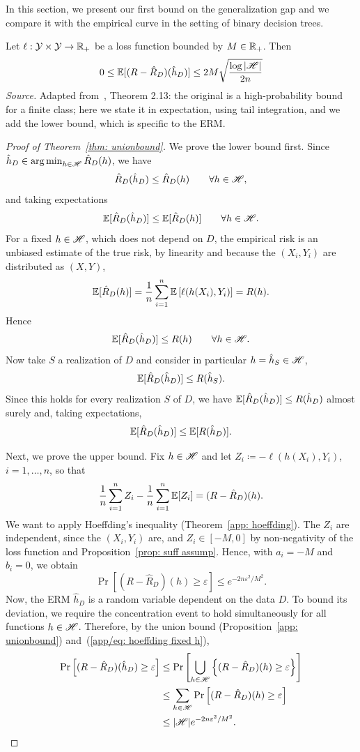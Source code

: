 \documentclass[reqno]{amsart}
\begin{document}
In this section, we present our first bound on the generalization gap and we compare it with the empirical curve in the setting of binary decision trees.

\begin{theorem}\label{thm: unionbound} Let $\ell:\mathcal{Y}\times\mathcal{Y}\to\mathbb{R}_+$ be a loss function bounded by $M\in\mathbb{R}_+$. Then
\[                
  0 \le \mathbb{E}[(R - \hat R_D)(\hat h_D)] \le 2M\sqrt{\frac{\log \vert \mathscr{H} \vert}{2n}}
\]
\textnormal{\emph{Source.} Adapted from~\cite{mohri2018foundations}, Theorem 2.13: the original is a high-probability bound for a finite class; here we state it in expectation, using tail integration, and we add the lower bound, which is specific to the ERM.}

\begin{proof}[Proof of Theorem~\ref{thm: unionbound}]
We prove the lower bound first. Since $\hat h_D \in \operatorname*{arg\,min}_{h\in\mathscr{H}} \hat R_D(h)$, we have
\[
\hat R_D(\hat h_D) \le \hat R_D(h) \qquad \forall h\in\mathscr{H},
\]
and taking expectations
\[
\mathbb{E}[\hat R_D(\hat h_D)] \le \mathbb{E}[\hat R_D(h)] \qquad \forall h\in\mathscr{H}.
\]
For a fixed $h\in\mathscr{H}$, which does not depend on $D$, the empirical risk is an unbiased estimate of the true risk, by linearity and because the $(X_i,Y_i)$ are distributed as $(X,Y)$,
\[
\mathbb{E}[\hat R_D(h)] = \frac1n\sum_{i=1}^n \mathbb{E}\left[\ell(h(X_i),Y_i)\right] = R(h).
\]
Hence
\[
\mathbb{E}[\hat R_D(\hat h_D)] \le R(h) \qquad \forall h\in\mathscr{H}.
\]
Now take $S$ a realization of $D$ and consider in particular $h=\hat h_{S}\in\mathscr{H}$,
\[
\mathbb{E}[\hat R_D(\hat h_D)] \le R(\hat h_{S}).
\]
Since this holds for every realization $S$ of $D$, we have $\mathbb{E}[\hat R_D(\hat h_D)] \le R(\hat h_D)$ almost surely and, taking expectations,
\[
\mathbb{E}[\hat R_D(\hat h_D)] \le \mathbb{E}[R(\hat h_D)].
\]

Next, we prove the upper bound. Fix $h\in\mathscr{H}$ and let $Z_i \coloneq -\ell(h(X_i),Y_i)$, $i=1,\ldots,n$, so that
\[
\frac1n\sum_{i=1}^n Z_i - \frac1n\sum_{i=1}^n \mathbb{E}[Z_i] = (R - \hat R_D)(h).
\]
We want to apply Hoeffding's inequality (Theorem~\ref{app: hoeffding}). The $Z_i$ are independent, since the $(X_i,Y_i)$ are, and $Z_i\in[-M,0]$ by non-negativity of the loss function and Proposition~\ref{prop: suff assump}. Hence, with $a_i = -M$ and $b_i = 0$, we obtain
\begin{equation}\label{app/eq: hoeffding fixed h}
\Pr\left[(R - \hat R_D)(h) \ge \varepsilon\right] \le e^{-2n\varepsilon^2/M^2}.
\end{equation}
Now, the ERM $\hat{h}_D$ is a random variable dependent on the data $D$. To bound its deviation, we require the concentration event to hold simultaneously for all functions $h \in \mathscr{H}$. Therefore, by the union bound (Proposition~\ref{app: unionbound}) and~(\ref{app/eq: hoeffding fixed h}),
\begin{align}\label{app/eq: unionbound prob}
\Pr\left[(R-\hat R_D)(\hat h_D) \ge \varepsilon\right] &\le \Pr\left[\bigcup_{h\in\mathscr{H}}\left\{(R - \hat R_D)(h)\ge\varepsilon\right\}\right] \notag \\
&\le \sum_{h\in\mathscr{H}} \Pr\left[(R - \hat R_D)(h)\ge \varepsilon\right] \notag \\
&\le \vert\mathscr{H}\vert e^{-2n\varepsilon^2/M^2}.
\end{align}


\end{proof}
\end{theorem}
\end{document}
